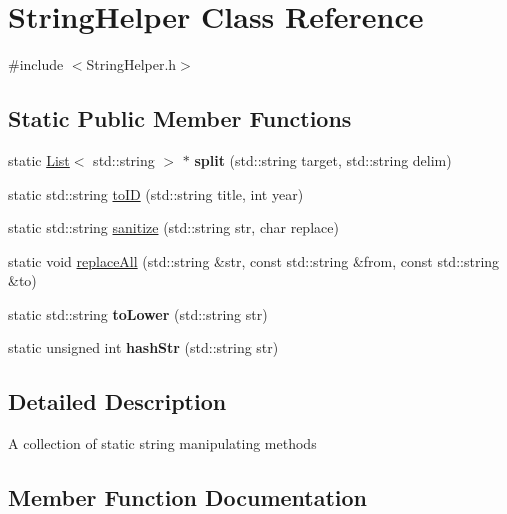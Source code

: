 \hypertarget{class_string_helper}{}\section{String\+Helper Class Reference}
\label{class_string_helper}


{\ttfamily \#include $<$String\+Helper.\+h$>$}

\subsection*{Static Public Member Functions}
\begin{DoxyCompactItemize}
\item 
\mbox{\label{class_string_helper_ac610979af20128f886c9f3f885ce5140}} 
static \hyperlink{class_list}{List}$<$ std\+::string $>$ $\ast$ {\bfseries split} (std\+::string target, std\+::string delim)
\item 
static std\+::string \hyperlink{class_string_helper_af1ebd6032d273477815fb71d50c47a82}{to\+ID} (std\+::string title, int year)
\item 
static std\+::string \hyperlink{class_string_helper_ae7ed857566d41bb983185121d9a85dd9}{sanitize} (std\+::string str, char replace)
\item 
static void \hyperlink{class_string_helper_a1e284887e820c917f1ad0e5358e8afda}{replace\+All} (std\+::string \&str, const std\+::string \&from, const std\+::string \&to)
\item 
\mbox{\label{class_string_helper_a731346b2d686aa86d3a97ae7a0ec01ac}} 
static std\+::string {\bfseries to\+Lower} (std\+::string str)
\item 
\mbox{\label{class_string_helper_afae14d117482d7289a8f57efb5cb7ee5}} 
static unsigned int {\bfseries hash\+Str} (std\+::string str)
\end{DoxyCompactItemize}


\subsection{Detailed Description}
A collection of static string manipulating methods 

\subsection{Member Function Documentation}
\mbox{\label{class_string_helper_a1e284887e820c917f1ad0e5358e8afda}} 
